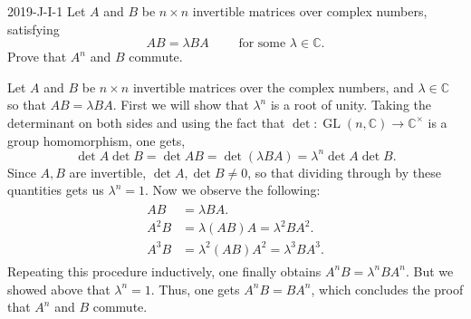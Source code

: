 \documentclass{article}
\begin{document}
	
	\begin{prb}{2019-J-I-1}
		Let $A$ and $B$ be $n \times n$ invertible matrices over complex numbers, satisfying 
		\begin{equation*}
			AB = \lambda BA \qquad \text{ for some $\lambda \in \mathbb{C}$}. 
		\end{equation*}
		Prove that $A^{n}$ and $B$ commute. 
	\end{prb}
	Let $A$ and $B$ be $n \times n$ invertible matrices over the complex numbers, and $\lambda \in \mathbb{C}$ so that $AB = \lambda BA$. First we will show that $\lambda^{n}$ is a root of unity. Taking the determinant on both sides and using the fact that $\det: \operatorname{GL}(n, \mathbb{C}) \to \mathbb{C}^{\times}$ is a group homomorphism, one gets, 
	\begin{equation*}
		\det{A}\det{B} = \det{AB} = \det(\lambda BA) = \lambda^{n}\det{A}\det{B}. 
	\end{equation*}
	Since $A, B$ are invertible, $\det{A}, \det{B} \neq 0$, so that dividing through by these quantities gets us $\lambda^{n} = 1$. Now we observe the following: 
	\begin{align*}
		\begin{split}
			AB &= \lambda BA. \\
			A^{2}B &= \lambda (AB)A = \lambda^{2}BA^{2}. \\
			A^{3}B &= \lambda^{2}(AB)A^{2} = \lambda^{3}BA^{3}. 
		\end{split}
	\end{align*}
	Repeating this procedure inductively, one finally obtains $A^{n}B = \lambda^{n}BA^{n}$. But we showed above that $\lambda^{n} = 1$. Thus, one gets $A^{n}B = BA^{n}$, which concludes the proof that $A^{n}$ and $B$ commute.
	
\end{document}
